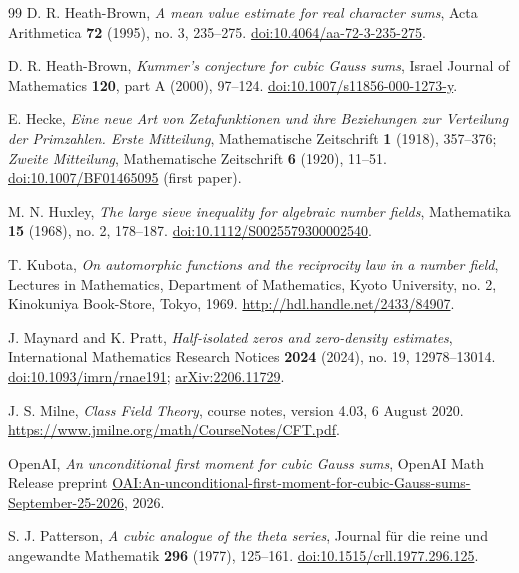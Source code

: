 \begin{thebibliography}{99}
D. R. Heath-Brown,
\emph{A mean value estimate for real character sums},
Acta Arithmetica \textbf{72} (1995), no. 3, 235--275.
\href{https://doi.org/10.4064/aa-72-3-235-275}{doi:10.4064/aa-72-3-235-275}.

D. R. Heath-Brown,
\emph{Kummer's conjecture for cubic Gauss sums},
Israel Journal of Mathematics \textbf{120}, part A (2000), 97--124.
\href{https://doi.org/10.1007/s11856-000-1273-y}{doi:10.1007/s11856-000-1273-y}.

E. Hecke,
\emph{Eine neue Art von Zetafunktionen und ihre Beziehungen zur
Verteilung der Primzahlen. Erste Mitteilung},
Mathematische Zeitschrift \textbf{1} (1918), 357--376;
\emph{Zweite Mitteilung}, Mathematische Zeitschrift \textbf{6} (1920),
11--51.
\href{https://doi.org/10.1007/BF01465095}{doi:10.1007/BF01465095}
(first paper).

M. N. Huxley,
\emph{The large sieve inequality for algebraic number fields},
Mathematika \textbf{15} (1968), no. 2, 178--187.
\href{https://doi.org/10.1112/S0025579300002540}{doi:10.1112/S0025579300002540}.

T. Kubota,
\emph{On automorphic functions and the reciprocity law in a number field},
Lectures in Mathematics, Department of Mathematics, Kyoto University,
no. 2, Kinokuniya Book-Store, Tokyo, 1969.
\url{http://hdl.handle.net/2433/84907}.

J. Maynard and K. Pratt,
\emph{Half-isolated zeros and zero-density estimates},
International Mathematics Research Notices \textbf{2024} (2024), no. 19,
12978--13014.
\href{https://doi.org/10.1093/imrn/rnae191}{doi:10.1093/imrn/rnae191};
\href{https://arxiv.org/abs/2206.11729}{arXiv:2206.11729}.

J. S. Milne,
\emph{Class Field Theory}, course notes, version 4.03, 6 August 2020.
\url{https://www.jmilne.org/math/CourseNotes/CFT.pdf}.

OpenAI,
\emph{An unconditional first moment for cubic Gauss sums},
OpenAI Math Release preprint
\href{https://github.com/openai/math/blob/main/preprints/An-unconditional-first-moment-for-cubic-Gauss-sums-September-25-2026/paper.pdf}{OAI:An-unconditional-first-moment-for-cubic-Gauss-sums-September-25-2026},
2026.

S. J. Patterson,
\emph{A cubic analogue of the theta series},
Journal f\"ur die reine und angewandte Mathematik \textbf{296} (1977),
125--161.
\href{https://doi.org/10.1515/crll.1977.296.125}{doi:10.1515/crll.1977.296.125}.


\end{thebibliography}
